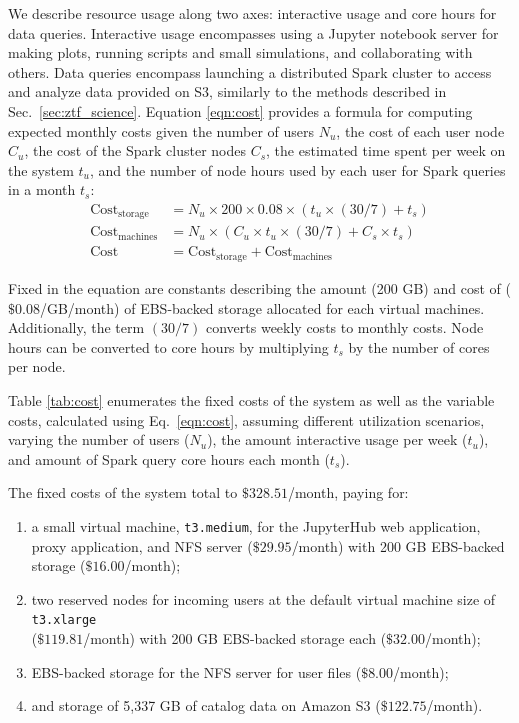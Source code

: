 \documentclass[twocolumn, linenumbers]{aastex631}
\begin{document}
We describe resource usage along two axes: interactive usage and core hours for data queries. Interactive usage encompasses using a Jupyter notebook server for making plots, running scripts and small simulations, and collaborating with others. Data queries encompass launching a distributed Spark cluster to access and analyze data provided on S3, similarly to the methods described in Sec.~\ref{sec:ztf_science}. Equation \ref{eqn:cost} provides a formula for computing expected monthly costs given the number of users $N_u$, the cost of each user node $C_u$, the cost of the Spark cluster nodes $C_s$, the estimated time spent per week on the system $t_u$, and the number of node hours used by each user for Spark queries in a month $t_s$: 
\begin{align}
    \text{Cost}_{\text{storage}} &= N_u \times 200 \times 0.08 \times (t_u \times (30/7) + t_s) \nonumber\\
    \text{Cost}_{\text{machines}} &= N_u \times (C_u \times t_u \times (30/7) + C_s \times t_s) \nonumber\\
    \text{Cost} &= \text{Cost}_{\text{storage}} + \text{Cost}_{\text{machines}} \label{eqn:cost}
\end{align}

Fixed in the equation are constants describing the amount (200 GB) and cost of ($\$0.08$/GB/month) of EBS-backed storage allocated for each virtual machines. Additionally, the term $(30/7)$ converts weekly costs to monthly costs. Node hours can be converted to core hours by multiplying $t_s$ by the number of cores per node.

Table \ref{tab:cost} enumerates the fixed costs of the system as well as the variable costs, calculated using Eq.~\ref{eqn:cost}, assuming different utilization scenarios, varying the number of users ($N_u$), the amount interactive usage per week ($t_u$), and amount of Spark query core hours each month ($t_s$).

The fixed costs of the system total to $\$328.51$/month, paying for:
\begin{enumerate}
    \item a small virtual machine, \texttt{t3.medium}, for the JupyterHub web application, proxy application, and NFS server ($\$29.95$/month) with 200 GB EBS-backed storage  ($\$16.00$/month);
    \item two reserved nodes for incoming users at the default virtual machine size of \texttt{t3.xlarge} \\($\$119.81$/month) with 200 GB EBS-backed storage each ($\$32.00$/month);
    \item EBS-backed storage for the NFS server for user files ($\$8.00$/month);
    \item and storage of 5,337 GB of catalog data on Amazon S3 ($\$122.75$/month).
\end{enumerate}
\end{document}
